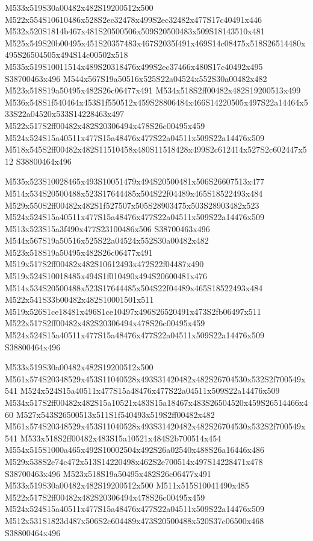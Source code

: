 \documentclass{article}
\begin{document}
\begin{multicols}{2}
M533x519S30a00482x482S19200512x500 M522x554S10610486x528S2ec32478x499S2ec32482x477S17c40491x446 M532x520S1814b467x481S20500506x509S20500483x509S18143510x481 M525x549S20b00495x451S20357483x467S2035f491x469S14c08475x518S26514480x495S26504505x494S14c00502x518 M535x519S10011514x489S20318476x499S2ec37466x480S17c40492x495 S38700463x496 M544x567S19a50516x525S22a04524x552S30a00482x482 M523x518S19a50495x482S26c06477x491 M534x518S2ff00482x482S19200513x499 M536x548S1f540464x453S1f550512x459S28806484x466S14220505x497S22a14464x533S22a04520x533S14228463x497 M522x517S2ff00482x482S20306494x478S26c00495x459 M524x524S15a40511x477S15a48476x477S22a04511x509S22a14476x509 M518x545S2ff00482x482S11510458x480S11518428x499S2c612414x527S2c602447x512 S38800464x496

M535x523S10028465x493S10051479x494S20500481x506S26607513x477 M514x534S20500488x523S17644485x504S22f04489x465S18522493x484 M529x550S2ff00482x482S1f527507x505S28903475x503S28903482x523 M524x524S15a40511x477S15a48476x477S22a04511x509S22a14476x509 M513x523S15a3f490x477S23100486x506 S38700463x496 M544x567S19a50516x525S22a04524x552S30a00482x482 M523x518S19a50495x482S26c06477x491 M519x517S2ff00482x482S10612493x472S22f04487x490 M519x524S10018485x494S1f010490x494S20600481x476 M514x534S20500488x523S17644485x504S22f04489x465S18522493x484 M522x541S33b00482x482S10001501x511 M519x526S1ce18481x496S1ce10497x496S26520491x473S2fb06497x511 M522x517S2ff00482x482S20306494x478S26c00495x459 M524x524S15a40511x477S15a48476x477S22a04511x509S22a14476x509 S38800464x496

M533x519S30a00482x482S19200512x500 M561x574S20348529x453S11040528x493S31420482x482S26704530x532S2f700549x541 M524x524S15a40511x477S15a48476x477S22a04511x509S22a14476x509 M534x517S2ff00482x482S15a10521x483S15a18467x483S26504520x459S26514466x460 M527x543S26500513x511S1f540493x519S2ff00482x482 M561x574S20348529x453S11040528x493S31420482x482S26704530x532S2f700549x541 M533x518S2ff00482x483S15a10521x484S2b700514x454 M554x515S1000a465x492S10002504x492S26a02540x488S26a16446x486 M529x538S2e74c472x513S14220498x462S2e700514x497S14228471x478 S38700463x496 M523x518S19a50495x482S26c06477x491 M533x519S30a00482x482S19200512x500 M511x515S10041490x485 M522x517S2ff00482x482S20306494x478S26c00495x459 M524x524S15a40511x477S15a48476x477S22a04511x509S22a14476x509 M512x531S1823d487x506S2c604489x473S20500488x520S37c06500x468 S38800464x496


\end{multicols}
\end{document}
